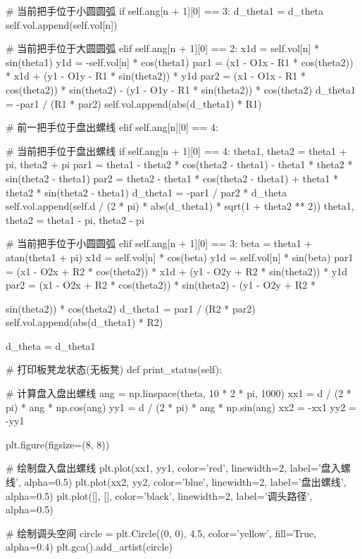 \documentclass[withoutpreface,bwprint]{cumcmthesis}
\begin{document}
\begin{CodeText}
   # 当前把手位于小圆圆弧
   if self.ang[n + 1][0] == 3:
      d_theta1 = d_theta
      self.vol.append(self.vol[n])

   # 当前把手位于大圆圆弧
   elif self.ang[n + 1][0] == 2:
      x1d = self.vol[n] * sin(theta1)
      y1d = -self.vol[n] * cos(theta1)
      par1 = (x1 - O1x - R1 * cos(theta2)) * x1d + (y1 - O1y - R1 * sin(theta2)) *
                 y1d
      par2 = (x1 - O1x - R1 * cos(theta2)) * sin(theta2) - (y1 - O1y - R1 *
                 sin(theta2)) * cos(theta2)
      d_theta1 = -par1 / (R1 * par2)
      self.vol.append(abs(d_theta1) * R1)

# 前一把手位于盘出螺线
elif self.ang[n][0] == 4:

   # 当前把手位于盘出螺线
   if self.ang[n + 1][0] == 4:
      theta1, theta2 = theta1 + pi, theta2 + pi
      par1 = theta1 - theta2 * cos(theta2 - theta1) - theta1 * theta2 * sin(theta2
                 - theta1)
      par2 = theta2 - theta1 * cos(theta2 - theta1) + theta1 * theta2 * sin(theta2
                 - theta1)
      d_theta1 = -par1 / par2 * d_theta
      self.vol.append(self.d / (2 * pi) * abs(d_theta1) * sqrt(1 + theta2 ** 2))
      theta1, theta2 = theta1 - pi, theta2 - pi

   # 当前把手位于小圆圆弧
   elif self.ang[n + 1][0] == 3:
      beta = theta1 + atan(theta1 + pi)
      x1d = self.vol[n] * cos(beta)
      y1d = self.vol[n] * sin(beta)
      par1 = (x1 - O2x + R2 * cos(theta2)) * x1d + (y1 - O2y + R2 * sin(theta2)) *
                 y1d
      par2 = (x1 - O2x + R2 * cos(theta2)) * sin(theta2) - (y1 - O2y + R2 *

                          sin(theta2)) * cos(theta2)
                d_theta1 = par1 / (R2 * par2)
                self.vol.append(abs(d_theta1) * R2)

      d_theta = d_theta1

# 打印板凳龙状态(无板凳)
def print_status(self):

   # 计算盘入盘出螺线
   ang = np.linspace(theta, 10 * 2 * pi, 1000)
   xx1 = d / (2 * pi) * ang * np.cos(ang)
   yy1 = d / (2 * pi) * ang * np.sin(ang)
   xx2 = -xx1
   yy2 = -yy1

   plt.figure(figsize=(8, 8))

   # 绘制盘入盘出螺线
   plt.plot(xx1, yy1, color='red', linewidth=2, label='盘入螺线', alpha=0.5)
   plt.plot(xx2, yy2, color='blue', linewidth=2, label='盘出螺线', alpha=0.5)
   plt.plot([], [], color='black', linewidth=2, label='调头路径', alpha=0.5)

   # 绘制调头空间
   circle = plt.Circle((0, 0), 4.5, color='yellow', fill=True, alpha=0.4)
   plt.gca().add_artist(circle)


\end{CodeText}
\end{document}
